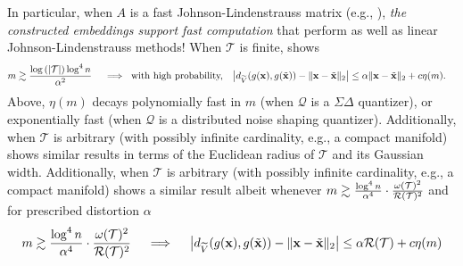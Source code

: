 In particular, when $A$ is a fast Johnson-Lindenstrauss matrix (e.g., \cite{ailon2009fast}), \emph{the constructed embeddings support fast computation} %
that perform as well as linear Johnson-Lindenstrauss methods!
When $\mathcal{T}$ is finite, \cite{huynh2018fast} shows 
\begin{align*} m \gtrsim \frac{\log{(|\mathcal{T}|)} \log^4 n}{\alpha^2} \quad \implies \textnormal{ with high probability,}  \quad \big|d_{\widetilde{V}}(g(\mathbf{x}), g(\tilde{\mathbf{x}})) - \|\mathbf{x} - \tilde{\mathbf{x}}\|_2\big| & \leq {\alpha}\|\mathbf{x} - \tilde{\mathbf{x}}\|_2 + c\eta(m).
\end{align*}
Above, $\eta(m)$ decays polynomially fast in $m$ (when $\mathcal{Q}$ is a $\Sigma\Delta$ quantizer), or exponentially fast (when $\mathcal{Q}$ is a distributed noise shaping quantizer). %
Additionally, when $\mathcal{T}$ is arbitrary (with possibly infinite cardinality, e.g., a compact manifold) \cite{huynh2018fast} shows similar results in terms of the Euclidean radius of $\mathcal{T}$ and its Gaussian width.
\iffalse
{Additionally, when $\mathcal{T}$ is arbitrary (with possibly infinite cardinality, e.g., a compact manifold)} \cite{huynh2018fast} shows a similar result albeit whenever $m \gtrsim \frac{\log^4 n}{\alpha^4}\cdot\frac{\omega(\mathcal{T})^2}{\mathcal{R}(\mathcal{T})^2}$
%
\iffalse and for prescribed distortion $\alpha$
\[ m \gtrsim \frac{\log^4 n}{\alpha^4}\cdot\frac{\omega(\mathcal{T})^2}{\mathcal{R}(\mathcal{T})^2} \quad \implies \quad \big|d_{\widetilde{V}}(g(\mathbf{x}), g(\tilde{\mathbf{x}})) - \|\mathbf{x} - \tilde{\mathbf{x}}\|_2\big| \leq \alpha \mathcal{R}(\mathcal{T}) + c\eta(m)\]

